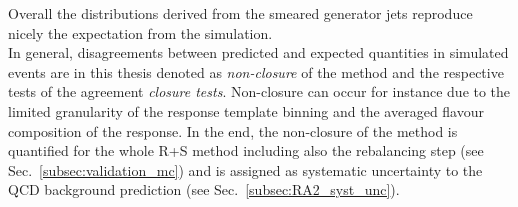 Overall the distributions derived from the smeared generator jets reproduce nicely the expectation from the simulation. \\
In general, disagreements between predicted and expected quantities in simulated events are in this thesis denoted as \textit{non-closure} of the method and the respective tests of the agreement \textit{closure tests}. Non-closure can occur for instance due to the limited granularity of the response template binning and the averaged flavour composition of the response. In the end, the non-closure of the method is quantified for the whole R+S method including also the rebalancing step (see Sec.~\ref{subsec:validation_mc}) and is assigned as systematic uncertainty to the QCD background prediction (see Sec.~\ref{subsec:RA2_syst_unc}). 


